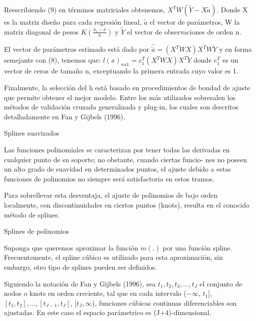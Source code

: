 \hspace*{0.4 cm} Reescribiendo (9) en t\'erminos matriciales obtenemos, $X^{T}W(\tilde{Y}-X \tilde{a})$. Donde X es la matriz dise\~no para cada regresi\'on lineal, $\tilde{a}$ el vector de
par\'ametros, W la matriz diagonal de pesos $K(\frac{x_{i}-x}{h})$ y $\tilde{Y}$ el vector de observaciones de orden n.


\hspace*{0.4 cm} El vector de par\'ametros estimado est\'a dado por $ \hat{\tilde{a}} = (X^{T}WX)X^{T}W \tilde{Y} $
y en forma semejante con (8), tenemos que: $l(x)_{nx1} = e_{1}^{T} (X^{T}WX)X^{T} \tilde{Y}$ donde $e_{1}^{T}$
es un vector de ceros de tama\~no n, exceptuando la primera entrada cuyo valor es 1.

\hspace*{0.4 cm}Finalmente, la selecci\'on del h est\'a basado en procedimientos de bondad de ajuste que permite obtener el mejor modelo. Entre los m\'as utilizados sobresalen los m\'etodos de validaci\'on cruzada generalizada y plug-in, los cuales son descritos detalladamente en Fan y Gijbels (1996).


Splines suavizados


\hspace*{0.4 cm} Las funciones polinomiales se caracterizan por tener todas las derivadas en cualquier punto de su soporte; no obstante, cuando ciertas funcio- nes no poseen un alto grado de suavidad en determinados puntos, el ajuste debido a estas funciones de polinomios no siempre ser\'a satisfactoria en estos tramos.

\hspace*{0.4 cm} Para sobrellevar esta desventaja, el ajuste de polinomios de bajo orden localmente, con discontinuidades en ciertos puntos (knots), resulta en el conocido m\'etodo de splines.

Splines de polinomios

\hspace*{0.4 cm}Suponga que queremos aproximar la funci\'on $m(.)$ por una funci\'on spline. Frecuentemente, el spline c\'ubico es utilizado para esta aproximaci\'on, sin embargo, otro tipo de splines pueden ser definidos.


\hspace*{0.4 cm}Siguiendo la notaci\'on de Fan y Gijbels (1996), sea $t_{1}, t_{2}, t_{3},...,t_{J}$ el conjunto de nodos o knots en orden creciente, tal que en cada intervalo  ($-\infty$, $t_{1}$], $[t_{1}, t_{2}],..., [t_{J-1}, t_{J}]$, [$t_{J}, \infty$), funciones c\'ubicas continuas diferenciables son ajustadas. En este caso el espacio par\'ametrico es (J+4)-dimensional.

